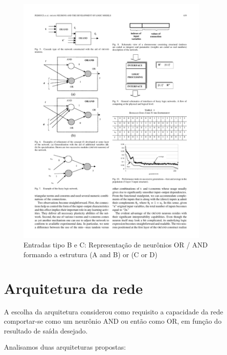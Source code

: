 \documentclass{IEEEtran}
\begin{document}
\begin{figure}
	\centering
	\includegraphics[width=95mm]{andOrOutras.pdf}
	\caption{Entradas tipo B e C: Representação de neurônios OR / AND formando a estrutura (A and B) or (C or D)}
	\label{andOrOutras}
\end{figure}

\section{Arquitetura da rede}
A escolha da arquitetura considerou como requisito a capacidade da rede comportar-se como um neurônio AND ou então como OR, em função do resultado de saída desejado. 

Analisamos duas arquiteturas propostas:
\end{document}
